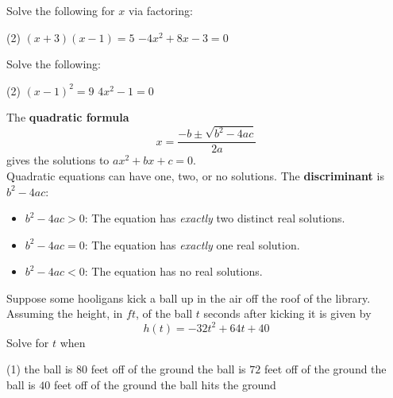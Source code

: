 \documentclass[../mathNotesPreamble]{subfiles}
\begin{document}
    \begin{ex*}
      Solve the following for $x$ via factoring:
    \end{ex*}
    \begin{extasks}[after-item-skip=\stretch{1}](2)
      \task $(x+3)(x-1)=5$
      \task $-4x^2+8x-3=0$
    \end{extasks}
    \pagebreak

    \begin{center}
    \end{center}
    
    \begin{ex*}
      Solve the following:
    \end{ex*}
    \begin{extasks}[after-item-skip=\stretch{1}](2)
      \task $(x-1)^2=9$
      \task $4x^2-1=0$
    \end{extasks}

    \begin{defn*}
      The \textbf{quadratic formula} 
        \[x=\dfrac{-b\pm\sqrt{b^2-4ac}}{2a}\]
      gives the solutions to $ax^2+bx+c=0$.\\[\baselineskip]
      Quadratic equations can have one, two, or no solutions. The \textbf{discriminant} is $b^2-4ac$:
      \begin{itemize}
        \item $b^2-4ac>0$: The equation has \emph{exactly} two distinct real solutions.
        \item $b^2-4ac=0$: The equation has \emph{exactly} one real solution.
        \item $b^2-4ac<0$: The equation has no real solutions.
      \end{itemize}
    \end{defn*}
    \pagebreak

    \begin{ex*}
      Suppose some hooligans kick a ball up in the air off the roof of the library. Assuming the height, in $ft$, of the ball $t$ seconds after kicking it is given by 
        \[h(t)=-32t^2+64t+40\]
      Solve for $t$ when 
    \end{ex*}
    \begin{extasks}[after-item-skip=\stretch{1}](1)
      \task the ball is $80$ feet off of the ground
      \task the ball is $72$ feet off of the ground
      \task the ball is $40$ feet off of the ground
      \task the ball hits the ground
    \end{extasks}
    \pagebreak
    
\end{document}
